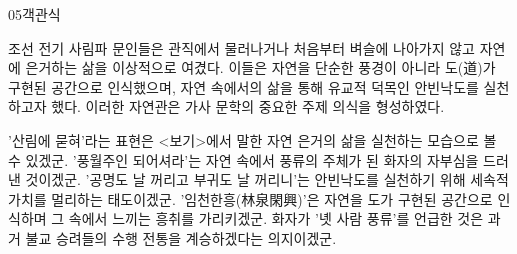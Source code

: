 \documentclass[fs85,seriesWit]{korfarm-base}
\begin{document}
\begin{kfQBlock}{05}{객관식}
\begin{kfEvidence}조선 전기 사림파 문인들은 관직에서 물러나거나 처음부터 벼슬에 나아가지 않고 자연에 은거하는 삶을 이상적으로 여겼다. 이들은 자연을 단순한 풍경이 아니라 도(道)가 구현된 공간으로 인식했으며, 자연 속에서의 삶을 통해 유교적 덕목인 안빈낙도를 실천하고자 했다. 이러한 자연관은 가사 문학의 중요한 주제 의식을 형성하였다.\end{kfEvidence}
\begin{kfChoices}
\kfChoice '산림에 묻혀'라는 표현은 <보기>에서 말한 자연 은거의 삶을 실천하는 모습으로 볼 수 있겠군.
\kfChoice '풍월주인 되어셔라'는 자연 속에서 풍류의 주체가 된 화자의 자부심을 드러낸 것이겠군.
\kfChoice '공명도 날 꺼리고 부귀도 날 꺼리니'는 안빈낙도를 실천하기 위해 세속적 가치를 멀리하는 태도이겠군.
\kfChoice '임천한흥(林泉閑興)'은 자연을 도가 구현된 공간으로 인식하며 그 속에서 느끼는 흥취를 가리키겠군.
\kfChoice 화자가 '녯 사람 풍류'를 언급한 것은 과거 불교 승려들의 수행 전통을 계승하겠다는 의지이겠군.
\end{kfChoices}
\end{kfQBlock}

\kfEndMC
\end{document}
